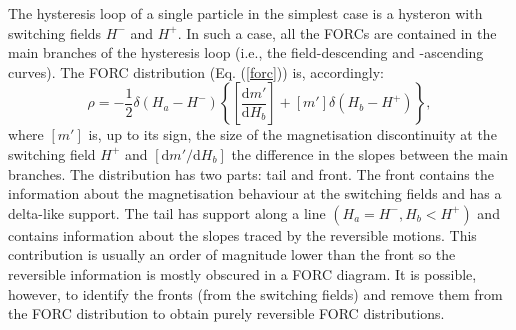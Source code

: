 The hysteresis loop of a single particle in the simplest case is a hysteron with switching fields $H^{-}$ and $H^{+}$. In such a case, all the FORCs are contained in the main branches of the hysteresis loop (i.e., the field-descending and -ascending curves). The FORC distribution (Eq. (\ref{forc})) is, accordingly:
\begin{equation}\label{forc hysteron}
\rho = -\frac{1}{2} \delta \left( H_a - H^{-} \right) \left\{ \left[ \frac{\text{d} m' }{\text{d}H_b} \right] + \left[ m' \right] \delta(H_b - H^{+}) \right\},
\end{equation}
where $\left[ m' \right]$ is, up to its sign, the size of the magnetisation discontinuity at the switching field $H^{+}$ and $\left[ \text{d} m' / \text{d}H_b \right]$ the difference in the slopes between the main branches. The distribution has two parts: tail and front. The front contains the information about the magnetisation behaviour at the switching fields and has a delta-like support. The tail has support along a line $(H_a=H^{-}, H_b<H^{+})$ and contains information about the slopes traced by the reversible motions. This contribution is usually an order of magnitude lower than the front so the reversible information is mostly obscured in a FORC diagram. It is possible, however, to identify the fronts (from the switching fields) and remove them from the FORC distribution to obtain purely reversible FORC distributions.\par

